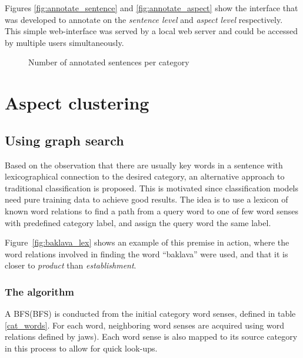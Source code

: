 \documentclass[a4paper,11pt]{kth-mag}
\begin{document}
Figures \ref{fig:annotate_sentence} and \ref{fig:annotate_aspect} show the interface that was developed to annotate on the \emph{sentence level} and \emph{aspect level} respectively. This simple web-interface was served by a local web server and could be accessed by multiple users simultaneously.


\begin{figure}[t]
  \centering
  \caption{Number of annotated sentences per category}
  \label{fig:cat_count}
\end{figure}


\newpage

\section{Aspect clustering}
\subsection{Using graph search}
Based on the observation that there are usually key words in a sentence with lexicographical connection to the desired category, an alternative approach to traditional classification is proposed. This is motivated since classification models need pure training data to achieve good results. The idea is to use a lexicon of known word relations to find a path from a query word to one of few word senses with predefined category label, and assign the query word the same label.

Figure~\ref{fig:baklava_lex} shows an example of this premise in action, where the word relations involved in finding the word ``baklava'' were used, and that it is closer to \emph{product} than \emph{establishment}.

\subsubsection{The algorithm}
A \gls{BFS}(BFS) is conducted from the initial category word senses, defined in table \ref{cat_words}. For each word, neighboring word senses are acquired using word relations defined by \gls{jaws}). Each word sense is also mapped to its source category in this process to allow for quick look-ups.
\end{document}

